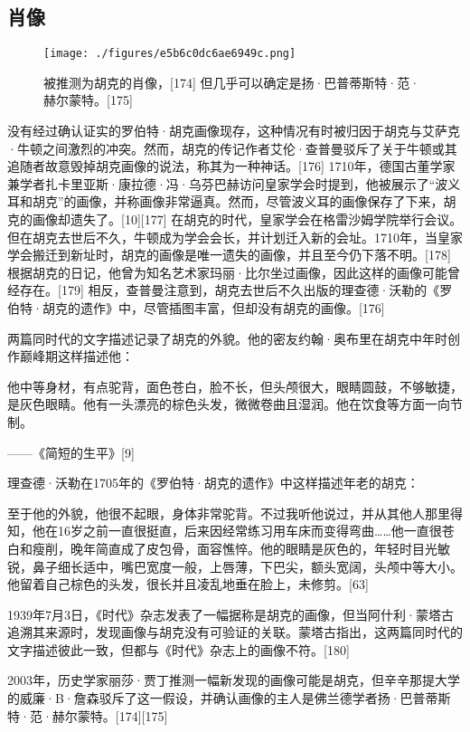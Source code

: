 \subsection{肖像}
\begin{figure}[ht]
\centering
\texttt{[image: ./figures/e5b6c0dc6ae6949c.png]}
\caption{被推测为胡克的肖像，[174] 但几乎可以确定是扬·巴普蒂斯特·范·赫尔蒙特。[175]} \label{fig_HK_10}
\end{figure}
没有经过确认证实的罗伯特·胡克画像现存，这种情况有时被归因于胡克与艾萨克·牛顿之间激烈的冲突。然而，胡克的传记作者艾伦·查普曼驳斥了关于牛顿或其追随者故意毁掉胡克画像的说法，称其为一种神话。[176] 1710年，德国古董学家兼学者扎卡里亚斯·康拉德·冯·乌芬巴赫访问皇家学会时提到，他被展示了“波义耳和胡克”的画像，并称画像非常逼真。然而，尽管波义耳的画像保存了下来，胡克的画像却遗失了。[10][177] 在胡克的时代，皇家学会在格雷沙姆学院举行会议。但在胡克去世后不久，牛顿成为学会会长，并计划迁入新的会址。1710年，当皇家学会搬迁到新址时，胡克的画像是唯一遗失的画像，并且至今仍下落不明。[178] 根据胡克的日记，他曾为知名艺术家玛丽·比尔坐过画像，因此这样的画像可能曾经存在。[179] 相反，查普曼注意到，胡克去世后不久出版的理查德·沃勒的《罗伯特·胡克的遗作》中，尽管插图丰富，但却没有胡克的画像。[176]

两篇同时代的文字描述记录了胡克的外貌。他的密友约翰·奥布里在胡克中年时创作巅峰期这样描述他：

他中等身材，有点驼背，面色苍白，脸不长，但头颅很大，眼睛圆鼓，不够敏捷，是灰色眼睛。他有一头漂亮的棕色头发，微微卷曲且湿润。他在饮食等方面一向节制。

——《简短的生平》[9]

理查德·沃勒在1705年的《罗伯特·胡克的遗作》中这样描述年老的胡克：

至于他的外貌，他很不起眼，身体非常驼背。不过我听他说过，并从其他人那里得知，他在16岁之前一直很挺直，后来因经常练习用车床而变得弯曲……他一直很苍白和瘦削，晚年简直成了皮包骨，面容憔悴。他的眼睛是灰色的，年轻时目光敏锐，鼻子细长适中，嘴巴宽度一般，上唇薄，下巴尖，额头宽阔，头颅中等大小。他留着自己棕色的头发，很长并且凌乱地垂在脸上，未修剪。[63]

1939年7月3日，《时代》杂志发表了一幅据称是胡克的画像，但当阿什利·蒙塔古追溯其来源时，发现画像与胡克没有可验证的关联。蒙塔古指出，这两篇同时代的文字描述彼此一致，但都与《时代》杂志上的画像不符。[180]

2003年，历史学家丽莎·贾丁推测一幅新发现的画像可能是胡克，但辛辛那提大学的威廉·B·詹森驳斥了这一假设，并确认画像的主人是佛兰德学者扬·巴普蒂斯特·范·赫尔蒙特。[174][175]

